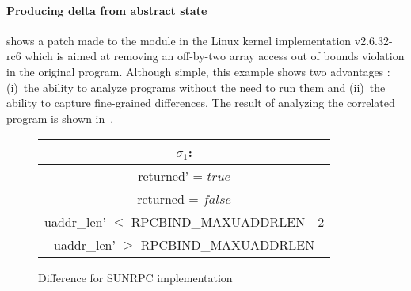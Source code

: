 %


\paragraph{Producing delta from abstract state}



 shows a patch made to the  module in the Linux kernel  implementation v2.6.32-rc6 which is aimed at removing an off-by-two array access out of bounds violation in the original program. Although simple, this example shows two advantages {\tool}: (i)~the ability to analyze programs without the need to run them and (ii)~the ability to capture fine-grained differences. The result of analyzing the correlated program is shown in~.

\begin{figure}
\scriptsize
\centering
\begin{tabular}{c}
$\sigma_1$:
\\ \hline
returned' = $true$
\\
returned = $false$
\\
uaddr\_len' $\leq$ RPCBIND\_MAXUADDRLEN - 2
\\
uaddr\_len' $\geq$ RPCBIND\_MAXUADDRLEN
\\ \hline
\end{tabular}
\caption{Difference for SUNRPC implementation}\label{Fi:sunrpc}

\end{figure}


